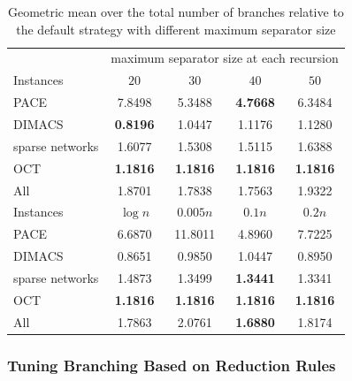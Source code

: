 \documentclass[12pt,a4paper,twoside]{scrartcl}
\numberwithin{equation}{section}
\begin{document}
\begin{table}[hbt!]
	\centering
	\begin{tabular}{l|cccc|}	  & \multicolumn{4}{c|}{maximum separator size at each recursion} \\ \cline{2-5}
		Instances & $20$ & $30$ & $40$ & $50$ \\
		\hline
		PACE & 7.8498 & 5.3488 & \textbf{4.7668} & 6.3484 \\
		DIMACS & \textbf{0.8196} & 1.0447 & 1.1176 & 1.1280  \\
		sparse networks & 1.6077 & 1.5308 & 1.5115 & 1.6388 \\
		OCT & \textbf{1.1816} & \textbf{1.1816} & \textbf{1.1816} & \textbf{1.1816} \\
		All & 1.8701 & 1.7838 & 1.7563 & 1.9322  \\ \hline \hline
		Instances & $\log n$ & $0.005n$ & $0.1n$ & $0.2n$ \\
		\hline
		PACE & 6.6870 & 11.8011 & 4.8960 & 7.7225 \\
		DIMACS & 0.8651 & 0.9850 & 1.0447 & 0.8950  \\
		sparse networks & 1.4873 & 1.3499 & \textbf{1.3441} & 1.3341 \\
		OCT & \textbf{1.1816} & \textbf{1.1816} & \textbf{1.1816} & \textbf{1.1816}  \\
		All & 1.7863 & 2.0761 & \textbf{1.6880} & 1.8174  \\ \hline
	\end{tabular}
	\caption{Geometric mean over the total number of branches relative to the default strategy with different maximum separator size}
	\label{tab:thresh4}
	
\end{table}


\subsubsection{Tuning Branching Based on Reduction Rules}
\end{document}

